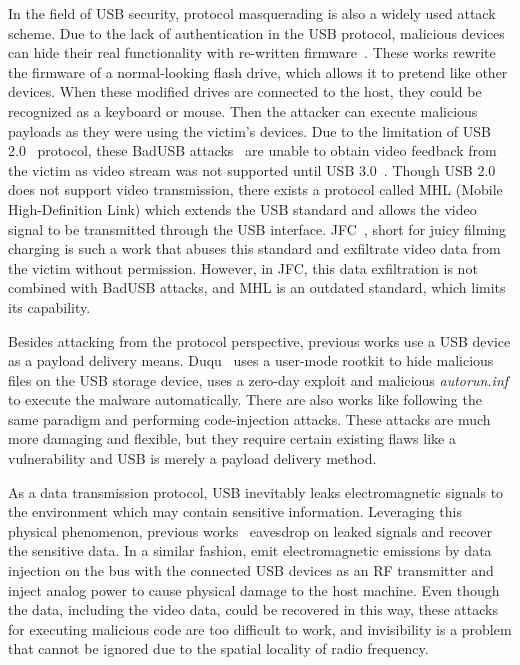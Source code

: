 In the field of USB security, protocol masquerading is also a widely used
attack scheme. Due to the lack of authentication in the USB protocol, malicious
devices can hide their real functionality with re-written
firmware~\cite{rubber,badusb,rubberducky2020,usbbypassing,iseeyou,usbdriver}.
These works rewrite the firmware of a normal-looking flash drive, which allows
it to pretend like other devices. When these modified drives are connected to the
host, they could be recognized as a keyboard or mouse. Then the attacker can
execute malicious payloads as they were using the victim's devices. Due to the
limitation of USB 2.0~\cite{usb20} protocol, these BadUSB
attacks~\cite{badusb} are unable to obtain video feedback from the victim
as video stream was not supported until USB 3.0~\cite{usb30}. Though USB 2.0 does not
support video transmission, there exists a protocol called MHL (Mobile
High-Definition Link) which extends the USB standard and allows the video signal to
be transmitted through the USB interface. JFC~\cite{JFC}, short for juicy filming
charging is such a work that abuses this standard and exfiltrate video data
from the victim without permission. However, in JFC, this data exfiltration is not
combined with BadUSB attacks, and MHL is an outdated standard, which limits its
capability.

Besides attacking from the protocol perspective, previous works use a
USB device as a payload delivery means. Duqu~\cite{duqu} uses a user-mode
rootkit to hide malicious files on the USB storage device, \cite{flame} uses a
zero-day exploit and malicious \textit{autorun.inf} to execute the malware
automatically. There are also works like \cite{brain,stuxnet,conficker}
following the same paradigm and performing code-injection attacks. These
attacks are much more damaging and flexible,
but they require certain existing flaws like a \cite{zero-day} vulnerability and USB is merely
a payload delivery method.

As a data transmission protocol, USB inevitably leaks electromagnetic signals
to the environment which may contain sensitive information. Leveraging this
physical phenomenon, previous works~\cite{smartphone,
poweremi,revealing,su2017usb,usbgpslocator,bates2014leveraging,badusbhub,usbfinger,side,usbdriver}
eavesdrop on leaked signals and recover the sensitive data. In a similar fashion,
\cite{usbee,turnip} emit electromagnetic emissions by data injection on the bus
with the connected USB devices as an RF transmitter and \cite{usbkiller,cable}
inject analog
power to cause physical damage to the host machine. Even though the data,
including the video data, could be recovered in this way, these attacks for
executing malicious code are too difficult to work, and invisibility is a
problem that cannot be ignored due to the spatial locality of radio frequency.

